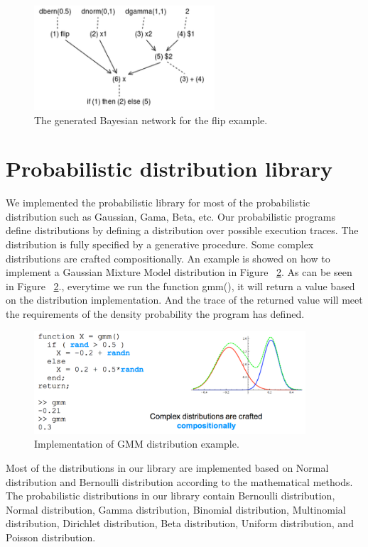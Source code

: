 \begin{figure}
    \centering
    \includegraphics[width=0.6\textwidth]{figures/flip_net.png}
    \caption{The generated Bayesian network for the flip example.}
    \label{fig:flip_net}
\end{figure}


\section{Probabilistic distribution library}
\label{sec:distr}
We implemented the probabilistic library for most of the probabilistic distribution such as Gaussian, Gama, Beta, etc. Our probabilistic programs define distributions by defining a distribution over possible execution traces. The distribution is fully specified by a generative procedure. Some complex distributions are crafted compositionally. An example is showed on how to implement a Gaussian Mixture Model distribution in Figure ~\ref{fig:gmm}. As can be seen in Figure ~\ref{fig:gmm}., everytime we run the function gmm(), it will return a value based on the distribution implementation. And the trace of the returned value will meet the requirements of the density probability the program has defined.


\begin{figure}
    \centering
    \includegraphics[width=0.9\textwidth]{figures/gmm.png}
    \caption{Implementation of GMM distribution example.}
    \label{fig:gmm}
\end{figure}


Most of the distributions in our library are implemented based on Normal distribution and Bernoulli distribution according to the mathematical methods. The probabilistic distributions in our library contain Bernoulli distribution, Normal distribution, Gamma distribution, Binomial distribution, Multinomial distribution, Dirichlet distribution, Beta distribution, Uniform distribution, and Poisson distribution.

